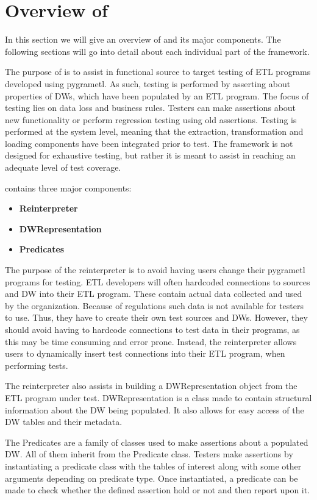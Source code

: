 \section{Overview of \FW{}}
In this section we will give an overview of \FW{} and its major components. The following sections will go into detail about each individual part of the framework.

The purpose of \FW{} is to assist in functional source to target testing of ETL programs developed using pygrametl. As such, testing is performed by asserting about properties of DWs, which have been populated by an ETL program. The focus of testing lies on data loss and business rules. Testers can make assertions about new functionality or perform regression testing using old assertions. Testing is performed at the system level, meaning that the extraction, transformation and loading components have been integrated prior to test. The framework is not designed for exhaustive testing, but rather it is meant to assist in reaching an adequate level of test coverage.

\FW{} contains three major components:
\begin{itemize}
\item\textbf{ Reinterpreter}
\item \textbf{DWRepresentation}
\item \textbf{Predicates}
\end{itemize}

The purpose of the reinterpreter is to avoid having users change their pygrametl programs for testing. ETL developers will often hardcoded connections to sources and DW into their ETL program. These contain actual data collected and used by the organization. Because of regulations such data is not available for testers to use. Thus, they have to create their own test sources and DWs. However, they should avoid having to hardcode connections to test data in their programs, as this may be time consuming and error prone. Instead, the reinterpreter allows users to dynamically insert test connections into their ETL program, when performing tests.

The reinterpreter also assists in building a DWRepresentation object from the ETL program under test. DWRepresentation is a class made to contain structural information about the DW being populated. It also allows for easy access of the DW tables and their metadata.

The Predicates are a family of classes used to make assertions about a populated DW. All of them inherit from the Predicate class. Testers make assertions by instantiating a predicate class with the tables of interest along with some other arguments depending on predicate type. Once instantiated, a predicate can be made to check whether the defined assertion hold or not and then report upon it.

